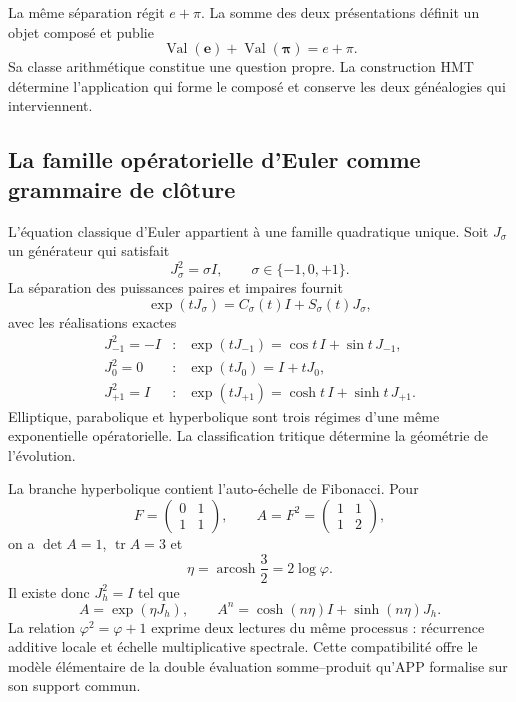 La même séparation régit \(e+\pi\). La somme des deux présentations
définit un objet composé et publie
\[
 \operatorname{Val}(\boldsymbol e)+
 \operatorname{Val}(\boldsymbol\pi)=e+\pi.
\]
Sa classe arithmétique constitue une question propre. La construction HMT
détermine l'application qui forme le composé et conserve les deux généalogies qui
interviennent.

\subsection{La famille opératorielle d'Euler comme grammaire de clôture}

L'équation classique d'Euler appartient à une famille quadratique unique. Soit
\(J_\sigma\) un générateur qui satisfait
\[
 J_\sigma^2=\sigma I,
 \qquad \sigma\in\{-1,0,+1\}.
\]
La séparation des puissances paires et impaires fournit
\begin{equation}
 \exp(tJ_\sigma)=C_\sigma(t)I+S_\sigma(t)J_\sigma,
 \label{p3-83-c44-s2:eq:euler-trigeometrico-cierre-numero}
\end{equation}
avec les réalisations exactes
\[
\begin{array}{ccl}
J_{-1}^2=-I&:&\exp(tJ_{-1})=\cos t\,I+\sin t\,J_{-1},\\[1mm]
J_{0}^2=0&:&\exp(tJ_{0})=I+tJ_{0},\\[1mm]
J_{+1}^2=I&:&\exp(tJ_{+1})=\cosh t\,I+\sinh t\,J_{+1}.
\end{array}
\]
Elliptique, parabolique et hyperbolique sont trois régimes d'une même
exponentielle opératorielle. La classification tritique détermine la géométrie de
l'évolution.

La branche hyperbolique contient l'auto-échelle de Fibonacci. Pour
\[
 F=\begin{pmatrix}0&1\\1&1\end{pmatrix},
 \qquad
 A=F^2=\begin{pmatrix}1&1\\1&2\end{pmatrix},
\]
on a \(\det A=1\), \(\operatorname{tr}A=3\) et
\[
 \eta=\operatorname{arcosh}\frac32=2\log\varphi.
\]
Il existe donc \(J_h^2=I\) tel que
\begin{equation}
 A=\exp(\eta J_h),
 \qquad
 A^n=\cosh(n\eta)I+\sinh(n\eta)J_h.
 \label{p3-83-c44-s2:eq:fibonacci-euler-hiperbolico-cierre-numero}
\end{equation}
La relation \(\varphi^2=\varphi+1\) exprime deux lectures du même processus :
récurrence additive locale et échelle multiplicative spectrale. Cette
compatibilité offre le modèle élémentaire de la double évaluation
somme--produit qu'APP formalise sur son support commun.

